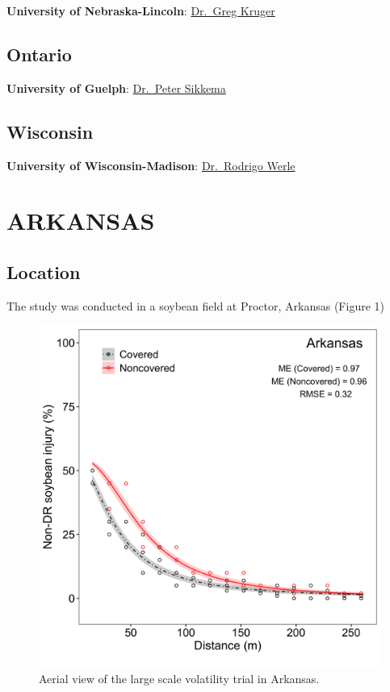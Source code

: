 \documentclass[]{article}
\begin{document}
\textbf{University of Nebraska-Lincoln}:
\href{https://agronomy.unl.edu/kruger}{Dr.~Greg Kruger}

\subsection{Ontario}\label{ontario}

\textbf{University of Guelph}:
\href{https://www.plant.uoguelph.ca/psikkema}{Dr.~Peter Sikkema}

\subsection{Wisconsin}\label{wisconsin}

\textbf{University of Wisconsin-Madison}:
\href{http://www.wiscweeds.info/}{Dr.~Rodrigo Werle}

\newpage

\section{ARKANSAS}\label{arkansas-1}

\subsection{Location}\label{location}

The study was conducted in a soybean field at Proctor, Arkansas (Figure
1)

\begin{figure}[h]

{\centering \includegraphics[width=1\linewidth]{Arkansas} 

}

\caption{Aerial view of the large scale volatility trial in Arkansas.}\label{fig:unnamed-chunk-4}
\end{figure}
\end{document}
